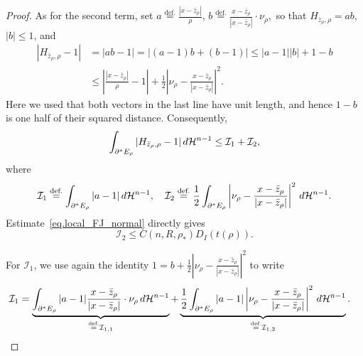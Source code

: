 \documentclass[10pt,a4paper]{amsart}
\newcommand{\dHn}{\,\dd\mathcal{H}^{n-1}}
\def\dd{{\rm d}}
\newcommand{\eqdef}{\overset{\text{def.}}{=}}
\begin{document}
\begin{proof}
As for the second term, set
$
 a\eqdef\frac{|x-\bar z_\rho|}{\rho}
$,
$
 b\eqdef\frac{x-\bar z_\rho}{|x-\bar z_\rho|}\cdot\nu_\rho,
$
so that $H_{\bar z_\rho,\rho}=ab$, $|b|\le1$, and
\begin{align*}
 |H_{\bar z_\rho,\rho}-1|
 &=|ab-1|=|(a-1)b+(b-1)|
 \le |a-1||b|+1-b\\
 &\le\left|\frac{|x-\bar z_\rho|}{\rho}-1\right|
 +\frac12\left|\nu_\rho-
 \frac{x-\bar z_\rho}{|x-\bar z_\rho|}\right|^2.
\end{align*}
Here we used that both vectors in the last line have unit length, and hence
$1-b$ is one half of their squared distance. Consequently,
\[
 \int_{\partial^*E_\rho}|H_{\bar z_\rho,\rho}-1|\dHn
 \le \mathcal I_1+\mathcal I_2,
\]
where
\begin{align*}
 \mathcal I_1\eqdef\int_{\partial^*E_\rho}|a-1|\dHn, \quad 
 \mathcal I_2\eqdef\frac12\int_{\partial^*E_\rho}
 \left|\nu_\rho-\frac{x-\bar z_\rho}{|x-\bar z_\rho|}\right|^2\dHn.
\end{align*}
Estimate~\eqref{eq.local_FJ_normal} directly gives
\begin{equation}\label{eq.I2_estimate}
 \mathcal I_2\le C(n,R,\rho_*)D_I(t(\rho)).
\end{equation}

For $\mathcal I_1$, we use again the identity
$\displaystyle
 1=b+\frac12\left|\nu_\rho-
 \frac{x-\bar z_\rho}{|x-\bar z_\rho|}\right|^2
$
to write
\begin{align*}
 \mathcal I_1
 &=\underbrace{\int_{\partial^*E_\rho}|a-1|
 \frac{x-\bar z_\rho}{|x-\bar z_\rho|}\cdot\nu_\rho\dHn}
 _{\eqdef\mathcal I_{1,1}}
 +
 \underbrace{\frac12\int_{\partial^*E_\rho}|a-1|
 \left|\nu_\rho-\frac{x-\bar z_\rho}{|x-\bar z_\rho|}\right|^2\dHn}
 _{\eqdef\mathcal I_{1,2}}.
\end{align*}


\end{proof}
\end{document}
